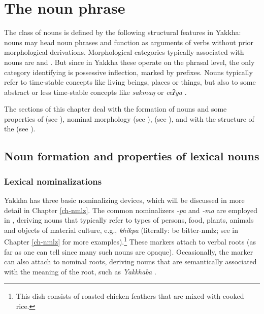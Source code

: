 \chapter{The noun phrase}\label{ch-noun}

The class of nouns is defined by the following structural features in Yakkha: nouns may head noun phrases and function as arguments of verbs without prior morphological derivations. Morphological categories typically associated with nouns are  and . But since in Yakkha these operate on the phrasal level, the only category identifying  is possessive inflection, marked by prefixes. Nouns typically refer to time-stable concepts like living beings, places or things, but also to some abstract or less time-stable concepts like \emph{sakmaŋ}  or \emph{ceʔya} .

The sections of this chapter deal with the formation of nouns and some properties of  (see ), nominal morphology (see ),   (see ), and with the structure of the  (see ). 

\section{Noun formation and properties of lexical nouns}\label{lex-noun}

\subsection{Lexical nominalizations}\label{lex-noun-1}

Yakkha has three basic nominalizing devices, which will be discussed in more detail in Chapter \ref{ch-nmlz}. The common  nominalizers \emph{-pa} and \emph{-ma} are employed in , deriving nouns that typically refer to types of persons, food, plants, animals and objects of material culture, e.g.,  \emph{khikpa}  (literally: be bitter-{\sc nmlz}; see  in Chapter \ref{ch-nmlz} for  more examples).\footnote{This dish consists of  roasted chicken feathers that are mixed with cooked rice.} These markers attach to verbal roots (as far as one can tell since many such nouns are opaque).  Occasionally, the marker can also attach to nominal roots, deriving nouns that are semantically associated with the meaning of the root, such as  \emph{Yakkhaba} . 


